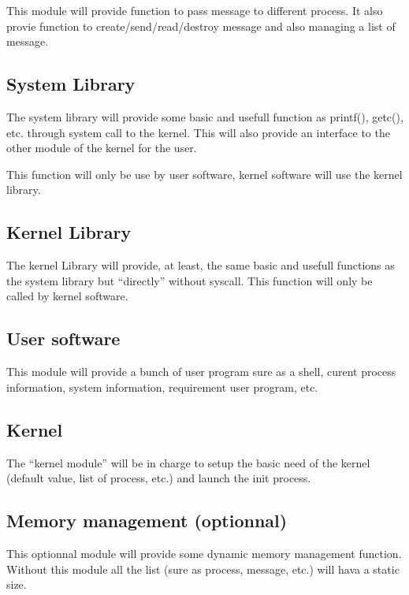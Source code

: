 This module will provide function to pass message to different process. It also provie function to create/send/read/destroy message and also managing a list of message.

\subsection{System Library}

The system library will provide some basic and usefull function as printf(), getc(), etc. through system call to the kernel. This will also provide an interface to the other module of the kernel for the user.

This function will only be use by user software, kernel software will use the kernel library.

\subsection{Kernel Library}

The kernel Library will provide, at least, the same basic and usefull functions as the system library but ``directly'' without syscall. This function will only be called by kernel software.

\subsection{User software}

This module will provide a bunch of user program sure as a shell, curent process information, system information, requirement user program, etc.

\subsection{Kernel}

The ``kernel module'' will be in charge to setup the basic need of the kernel (default value, list of process, etc.) and launch the init process.

\subsection{Memory management (optionnal)}

This optionnal module will provide some dynamic memory management function. Without this module all the list (sure as process, message, etc.) will hava a static size.

